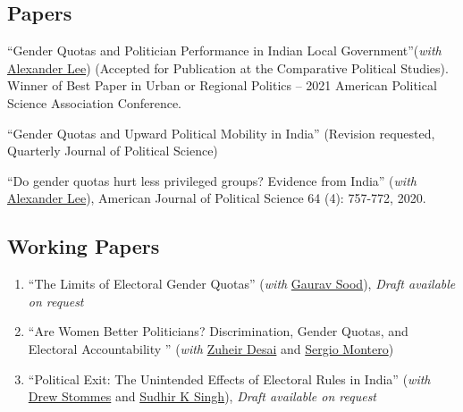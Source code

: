 
\subsection*{Papers}
\begin{etaremune}
	\item ``Gender Quotas and Politician Performance in Indian Local Government''(\textit{with} \href{https://www.rochester.edu/college/faculty/alexander_lee/}{Alexander Lee}) (Accepted for Publication at the Comparative Political Studies). \\ Winner of Best Paper in Urban or Regional Politics -- 2021 American Political Science Association Conference.






\item ``Gender Quotas and Upward Political Mobility in India'' (Revision requested, Quarterly Journal of Political Science)

\item  ``Do gender quotas hurt less privileged groups? Evidence from India'' (\textit{with} \href{https://www.rochester.edu/college/faculty/alexander_lee/}{Alexander Lee}), American Journal of Political Science 64 (4): 757-772, 2020.

\end{etaremune}


\subsection*{Working Papers} %
\label{sub:work_in_progress}
\begin{enumerate}
	\item ``The Limits of Electoral Gender Quotas'' (\textit{with} \href{https://www.gsood.com/}{Gaurav Sood}), \textit{Draft available on request}
	\item ``Are Women Better Politicians? Discrimination, Gender Quotas, and Electoral Accountability '' (\textit{with} \href{https://zuheirdesai.com/}{Zuheir Desai} and \href{https://www.sas.rochester.edu/psc/smontero/}{Sergio Montero})
	\item ``Political Exit: The Unintended Effects of Electoral Rules in India'' (\textit{with} \href{https://drew-stommes.github.io/}{Drew Stommes} and \href{https://www.sudhirksingh.com/}{Sudhir K Singh}), \textit{Draft available on request}
\end{enumerate}

